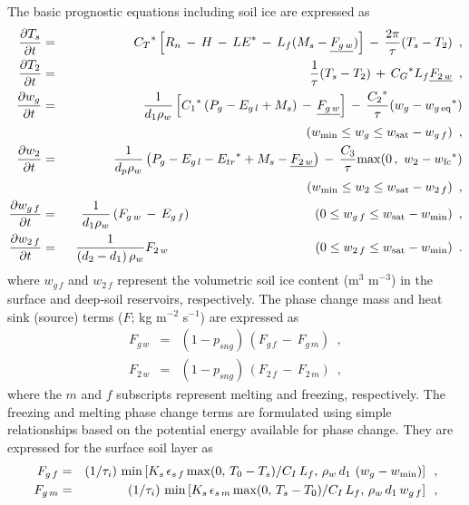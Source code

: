 The basic prognostic equations
including soil ice are expressed as
%
\begin{eqnarray}
{\partial T_s\over\partial t} &=&
{C_T}^\ast \left[ R_n \,-\, H \,-\, {LE}^\ast \,-\,
L_f(M_s-{\underline{F_{g\,w}}})\right] \,-\,
{2\pi\over\tau}(T_s-T_2)
\,\,\,, \\
%
{\partial T_2\over\partial t} &=&
{1\over\tau}(T_s-T_2)
\,+\,{C_G}^\ast L_f {\underline{F_{2\,w}}}
\,\,\,, \\
%
{\partial w_g\over\partial t} &=&
{1\over d_1\rho_w} \left[ {C_1}^\ast\left(P_g-E_{g\,l}+M_s \right)
\,-\, {\underline{F_{g\,w}}} \right]
\,-\, {{C_2}^\ast\over\tau}(w_g-{w_{g\,{\rm eq}}}^\ast) \\
& & \hskip2.6in
(w_{{\rm min}} \leq w_g \leq w_{\rm sat}-w_{g\,f})
\,\,\,, \\
%
{\partial w_2\over\partial t} &=&
{1\over d_p\rho_w}
\left(P_g-{E_{g\,l}}-{E_{tr}}^\ast+M_s-
{\underline{F_{2\,w}}} \right) \,-\,{C_3\over\tau}{\rm max}
(0\,,\,\,w_2-{w_{\rm fc}}^\ast) \\
& & \hskip2.6in
(w_{{\rm min}}\leq w_2 \leq w_{\rm sat}-w_{2\,f})
\,\,\,, \\
%
{\partial w_{g\,f}\over\partial t} &=&
{1\over d_1 \rho_w} \left(
F_{g\,w} \,-\, E_{g\,f} \right)
\hskip1.35in
(0 \leq w_{g\,f}\leq w_{\rm sat}-w_{{\rm min}} )
\,\,\,, \\
%
{\partial w_{2\,f}\over\partial t} &=&
{1\over \left(d_2-d_1\right)\rho_w} F_{2\,w}
\hskip1.6in
(0 \leq w_{2\,f}\leq w_{\rm sat}-w_{{\rm min}} )
\,\,\,.
\end{eqnarray}
%
where $w_{g\,f}$ and $w_{2\,f}$ represent the volumetric soil ice content
(m$^3$ m$^{-3}$) in the surface and deep-soil reservoirs, respectively.
The phase change mass and heat sink (source) terms ($F$; kg m$^{-2}$ s$^{-1}$)
are expressed as
%
\begin{eqnarray}
F_{g\,w} &=& \left(1-p_{sng}\right)\,\left( F_{g\,f}
\,-\, F_{g\,m}\right)\,\,\,, \\
%
F_{2\,w} &=& \left(1-p_{sng}\right)\,\left( F_{2\,f}
\,-\, F_{2\,m}\right)\,\,\,,
\end{eqnarray}
%
where the $m$ and $f$ subscripts represent melting and
freezing, respectively.
The freezing and melting phase change terms are formulated using simple
relationships based on the potential
energy available for phase change. They are expressed
for the surface soil layer as
%
\begin{eqnarray}
F_{g\,f} &=& \left(1/\tau_i \right)\,{\rm min} \left[
K_s \,\epsilon_{s\,f} \,{\rm max}(0,\,T_0-T_s)/C_I \, L_f ,\,
\rho_w\,d_1\,\left( w_g-w_{\rm min} \right)
\right]
\,\,\, , \\
%
F_{g\,m} &=& \left(1/\tau_i \right)\,{\rm min} \left[
K_s \,\epsilon_{s\,m} \,{\rm max}(0,\,T_s-T_0)/C_I \, L_f ,\,
\rho_w\,d_1\,w_{g\,f}
\right]
\,\,\, ,
\end{eqnarray}
